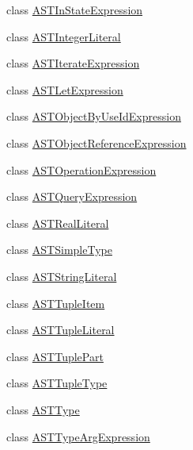 \begin{DoxyCompactItemize}
class \hyperlink{classorg_1_1tzi_1_1use_1_1parser_1_1ocl_1_1_a_s_t_in_state_expression}{A\-S\-T\-In\-State\-Expression}
\item 
class \hyperlink{classorg_1_1tzi_1_1use_1_1parser_1_1ocl_1_1_a_s_t_integer_literal}{A\-S\-T\-Integer\-Literal}
\item 
class \hyperlink{classorg_1_1tzi_1_1use_1_1parser_1_1ocl_1_1_a_s_t_iterate_expression}{A\-S\-T\-Iterate\-Expression}
\item 
class \hyperlink{classorg_1_1tzi_1_1use_1_1parser_1_1ocl_1_1_a_s_t_let_expression}{A\-S\-T\-Let\-Expression}
\item 
class \hyperlink{classorg_1_1tzi_1_1use_1_1parser_1_1ocl_1_1_a_s_t_object_by_use_id_expression}{A\-S\-T\-Object\-By\-Use\-Id\-Expression}
\item 
class \hyperlink{classorg_1_1tzi_1_1use_1_1parser_1_1ocl_1_1_a_s_t_object_reference_expression}{A\-S\-T\-Object\-Reference\-Expression}
\item 
class \hyperlink{classorg_1_1tzi_1_1use_1_1parser_1_1ocl_1_1_a_s_t_operation_expression}{A\-S\-T\-Operation\-Expression}
\item 
class \hyperlink{classorg_1_1tzi_1_1use_1_1parser_1_1ocl_1_1_a_s_t_query_expression}{A\-S\-T\-Query\-Expression}
\item 
class \hyperlink{classorg_1_1tzi_1_1use_1_1parser_1_1ocl_1_1_a_s_t_real_literal}{A\-S\-T\-Real\-Literal}
\item 
class \hyperlink{classorg_1_1tzi_1_1use_1_1parser_1_1ocl_1_1_a_s_t_simple_type}{A\-S\-T\-Simple\-Type}
\item 
class \hyperlink{classorg_1_1tzi_1_1use_1_1parser_1_1ocl_1_1_a_s_t_string_literal}{A\-S\-T\-String\-Literal}
\item 
class \hyperlink{classorg_1_1tzi_1_1use_1_1parser_1_1ocl_1_1_a_s_t_tuple_item}{A\-S\-T\-Tuple\-Item}
\item 
class \hyperlink{classorg_1_1tzi_1_1use_1_1parser_1_1ocl_1_1_a_s_t_tuple_literal}{A\-S\-T\-Tuple\-Literal}
\item 
class \hyperlink{classorg_1_1tzi_1_1use_1_1parser_1_1ocl_1_1_a_s_t_tuple_part}{A\-S\-T\-Tuple\-Part}
\item 
class \hyperlink{classorg_1_1tzi_1_1use_1_1parser_1_1ocl_1_1_a_s_t_tuple_type}{A\-S\-T\-Tuple\-Type}
\item 
class \hyperlink{classorg_1_1tzi_1_1use_1_1parser_1_1ocl_1_1_a_s_t_type}{A\-S\-T\-Type}
\item 
class \hyperlink{classorg_1_1tzi_1_1use_1_1parser_1_1ocl_1_1_a_s_t_type_arg_expression}{A\-S\-T\-Type\-Arg\-Expression}

\end{DoxyCompactItemize}
